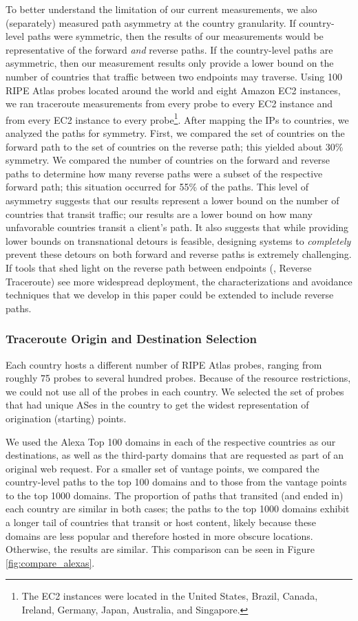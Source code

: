To better understand the limitation of our current measurements, we also (separately)
measured path asymmetry at the country granularity. If country-level paths
were symmetric, then the results of our measurements would be representative
of the forward {\it and} reverse paths. If the country-level paths are
asymmetric, then our measurement results only provide a lower bound on the
number of countries that traffic between two endpoints may traverse.  Using
100 RIPE Atlas probes located around the world and eight Amazon EC2 instances,
we ran traceroute measurements from every probe to every EC2 instance and from
every EC2 instance to every probe\footnote{The EC2 instances were located in the United States, Brazil, 
Canada, Ireland, Germany, Japan, Australia, and Singapore.}.  After mapping the IPs to countries, we
analyzed the paths for symmetry.  First, we compared the set of countries on
the forward path to the set of countries on the reverse path; this yielded
about 30\% symmetry.  We compared the number of countries on the forward and
reverse paths to determine how many reverse paths were a subset of the
respective forward path; this situation occurred for 55\% of the paths. This
level of asymmetry suggests that our results represent a lower bound on the
number of countries that transit traffic; our results are a lower bound on how
many unfavorable countries transit a client's path. It also suggests that
while providing lower bounds on transnational detours is feasible, designing
systems to {\em completely} prevent these detours on both forward and reverse
paths is extremely challenging. If tools that shed light on the reverse path
between endpoints (\eg, Reverse Traceroute) see more widespread deployment,
the characterizations and avoidance techniques that we develop in this paper could
be extended to include reverse paths.

\subsubsection{Traceroute Origin and Destination Selection}

Each country hosts a different number of RIPE Atlas probes, ranging
from roughly 75 probes to several hundred probes.  Because of the resource
restrictions, we could not use all of the probes in each country.  We
selected the set of probes that had unique ASes in the country to get
the widest representation of origination (starting) points.

We used the Alexa Top 100 domains in each of the respective countries as our
destinations, as well as the third-party domains that are requested as part of
an original web request.  For a smaller set of vantage points, we compared the
country-level paths to the top 100 domains and to those from the vantage
points to the top 1000 domains. The proportion of paths that transited (and
ended in) each country are similar in both cases; the paths to the top 1000
domains exhibit a longer tail of countries that transit or host content,
likely because these domains are less popular and therefore hosted in more
obscure locations. Otherwise, the results are similar.  This comparison can be 
seen in Figure \ref{fig:compare_alexas}.

